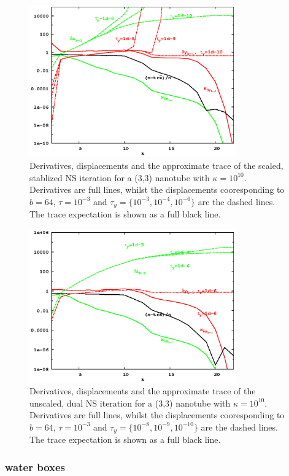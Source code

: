 \documentclass[letterpaper,twocolumn,amsmath,amsfont,amssymb,english,aps,jcp,preprintnumbers,groupaddress,nofootinbib,tightenlines]{revtex4}
\begin{document}
\begin{figure}[h]
\includegraphics[width=3.5in]{fig_33_tube_cond_10_scaled/33_tube_k10_scale_dual.eps}
\caption{Derivatives, displacements and the approximate trace of the scaled, stablized NS iteration for a
(3,3) nanotube with $\kappa =10^{10}$.
Derivatives are full lines, whilst the displacements cooresponding to $b=64$,
$\tau=10^{-3}$ and $\tau_y=\{10^{-3},10^{-4},10^{-6}\}$
are the dashed lines.  The trace expectation is shown as a full black line. }
\end{figure}


\begin{figure}[h]
\includegraphics[width=3.5in]{fig_33_tube_cond_10_scaled/33_tube_k10_scale_stab.eps}
\caption{Derivatives, displacements and the approximate trace of the unscaled, dual NS iteration for a (3,3) nanotube with $\kappa =10^{10}$.
Derivatives are full lines, whilst the displacements cooresponding to $b=64$, $\tau=10^{-3}$ and $\tau_y=\{10^{-8}, 10^{-9}, 10^{-10}\}$
are the dashed lines.  The trace expectation is shown as a full black line. }
\end{figure}

\subsubsection{water boxes}
\end{document}
